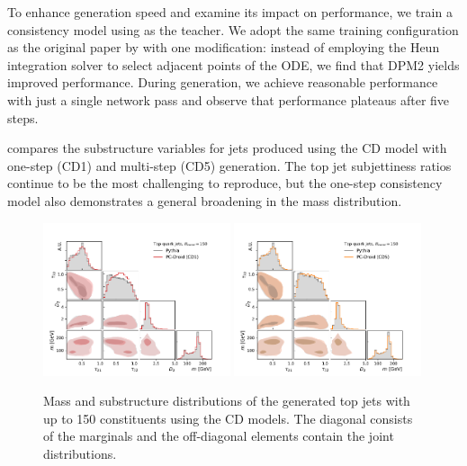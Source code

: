 To enhance generation speed and examine its impact on performance, we train a consistency model using \pcdroid as the teacher.
We adopt the same training configuration as the original paper by \textcite{ConsistencyModels} with one modification: instead of employing the Heun integration solver to select adjacent points of the ODE, we find that DPM2 yields improved performance.
During generation, we achieve reasonable performance with just a single network pass and observe that performance plateaus after five steps.

 compares the substructure variables for jets produced using the CD model with one-step (CD1) and multi-step (CD5) generation.
The top jet subjettiness ratios continue to be the most challenging to reproduce, but the one-step consistency model also demonstrates a general broadening in the mass distribution.

\begin{figure}[htpb]
    \centering
    \includegraphics[width=0.49\textwidth]{Figures/jet_generation/droid/150/hlvs/t/100/hlv_corr_PC-DroidCD1.pdf}
    \includegraphics[width=0.49\textwidth]{Figures/jet_generation/droid/150/hlvs/t/100/hlv_corr_PC-DroidCD5.pdf}
    \caption{
        Mass and substructure distributions of the generated top jets with up to 150 constituents using the CD models.
        The diagonal consists of the marginals and the off-diagonal elements contain the joint distributions.
    }
    \label{fig:cd-150}
\end{figure}

